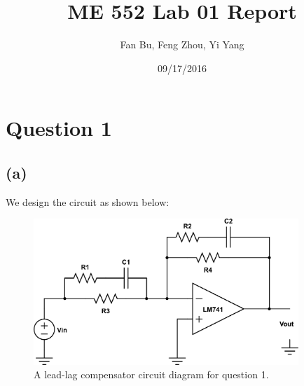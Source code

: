 \documentclass[letterpaper]{article}
\author{Fan Bu, Feng Zhou, Yi Yang}
\title{ME 552 Lab 01 Report}
\begin{document}
\date{09/17/2016}
\maketitle

\newcommand{\trace}{\mathrm{trace}}
\newcommand{\real}{\mathbb R}  %
\newcommand{\nat}{\mathbb N}   %
\newcommand{\cp}{\mathbb C}    %
\newcommand{\ds}{\displaystyle}
\newcommand{\mf}[2]{\frac{\ds #1}{\ds #2}}
\newcommand{\spanof}[1]{\textrm{span} \{ #1 \}}
\newcommand{\sol}[0]{\textbf{Solution: }}
\newcommand{\pf}[0]{\textbf{Proof:}}
\newcommand{\rme}[0]{\textrm{e}}
\newcommand{\Null}[1]{\textrm{Null}\{#1\}}
\parindent 0pt
\section*{Question 1}
\subsection*{(a)}
We design the circuit as shown below:\\
\begin{figure}[h]
\begin{center}
\includegraphics[width=10cm]{q1_circuitDiagram.png}
\end{center}
\caption{A lead-lag compensator circuit diagram for question 1.}
\label{q1_a}
\end{figure}
\end{document}

